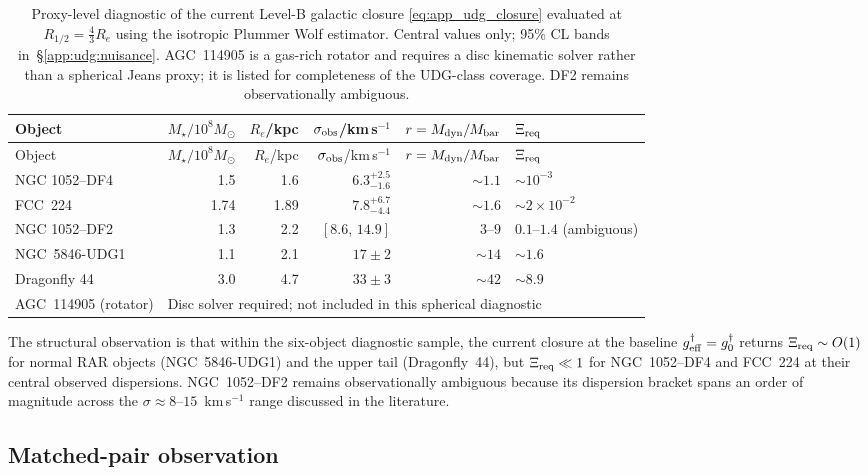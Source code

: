 \begin{longtable}{@{}l r r r r l@{}}
\caption{Proxy-level diagnostic of the current Level-B galactic
closure \eqref{eq:app_udg_closure} evaluated at
$R_{1/2}=\tfrac{4}{3}R_e$ using the isotropic Plummer Wolf
estimator.  Central values only; 95\% CL bands
in~\S\ref{app:udg:nuisance}.  AGC~114905 is a gas-rich rotator and
requires a disc kinematic solver rather than a spherical Jeans
proxy; it is listed for completeness of the UDG-class coverage.
DF2 remains observationally ambiguous.}
\label{tab:udg_stress_test}\\
\toprule
Object & $M_\star/10^8M_\odot$ & $R_e$/kpc &
$\sigma_{\rm obs}$/km\,s$^{-1}$ & $r=M_{\rm dyn}/M_{\rm bar}$ &
$\Xi_{\rm req}$\\
\midrule
\endfirsthead
\toprule
Object & $M_\star/10^8M_\odot$ & $R_e$/kpc &
$\sigma_{\rm obs}$/km\,s$^{-1}$ & $r=M_{\rm dyn}/M_{\rm bar}$ &
$\Xi_{\rm req}$\\
\midrule
\endhead
\bottomrule
\endfoot
NGC 1052--DF4        & 1.5  & 1.6  & $6.3^{+2.5}_{-1.6}$ & $\sim 1.1$ & $\sim 10^{-3}$ \\
FCC~224              & 1.74 & 1.89 & $7.8^{+6.7}_{-4.4}$ & $\sim 1.6$ & $\sim 2\times 10^{-2}$ \\
NGC 1052--DF2        & 1.3  & 2.2  & $[8.6,\,14.9]$      & $3$--$9$   & $0.1$--$1.4$ (ambiguous) \\
NGC~5846-UDG1        & 1.1  & 2.1  & $17\pm 2$           & $\sim 14$  & $\sim 1.6$ \\
Dragonfly 44         & 3.0  & 4.7  & $33\pm 3$           & $\sim 42$  & $\sim 8.9$ \\
AGC~114905 (rotator) & \multicolumn{5}{l}{Disc solver required; not included in this spherical diagnostic} \\
\end{longtable}

The structural observation is that within the six-object diagnostic
sample, the current closure at the baseline
$g^\dagger_{\rm eff}=g^\dagger_0$ returns $\Xi_{\rm req}\sim O(1)$
for normal RAR objects (NGC~5846-UDG1) and the upper tail
(Dragonfly~44), but $\Xi_{\rm req}\ll 1$ for NGC~1052--DF4 and
FCC~224 at their central observed dispersions.  NGC~1052--DF2
remains observationally ambiguous because its dispersion bracket
spans an order of magnitude across the
$\sigma\approx 8$--$15$~km\,s$^{-1}$ range discussed in the
literature.

\subsection{Matched-pair observation}
\label{app:udg:matched_pair}


